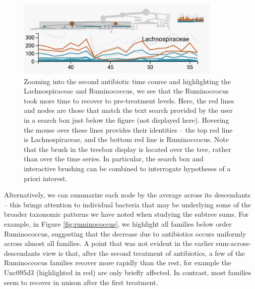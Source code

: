 \begin{figure}
{\centering \includegraphics[width=375px]{figure/treelapse/antibiotic_firmicutes}

}

\caption{Zooming into the second antibiotic time course and highlighting the
  Lachnospiraceae and Ruminococcus, we see that the Ruminoccocus took more time
  to recover to pre-treatment levels. Here, the red lines and nodes are those
  that match the text search provided by the user in a search box just below the
  figure (not displayed here). Hovering the mouse over these lines provides
  their identities -- the top red line is Lachnospiraceae, and the bottom red
  line is Ruminoccocus. Note that the brush in the treebox display is located
  over the tree, rather than over the time series. In particular, the search box
  and interactive brushing can be combined to interrogate hypotheses of a priori
  interest. \label{fig:antibioticfirmicutes}}
\end{figure}

Alternatively, we can summarize each node by the average across its descendants
-- this brings attention to individual bacteria that may be underlying some of
the broader taxonomic patterns we have noted when studying the subtree sums. For
example, in Figure \ref{fig:ruminococcus}, we highlight all families below order
Ruminococcus, suggesting that the decrease due to antibiotics occurs uniformly
across almost all families. A point that was not evident in the earlier
sum-across-descendants view is that, after the second treatment of antibiotics,
a few of the Ruminoccocus families recover more rapidly than the rest, for
example the Unc095d3 (highlighted in red) are only briefly affected. In
contrast, most families seem to recover in unison after the first treatment.


